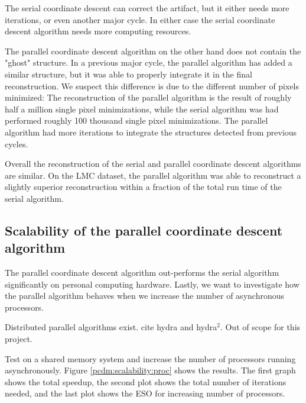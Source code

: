 The serial coordinate descent can correct the artifact, but it either needs more iterations, or even another major cycle. In either case the serial coordinate descent algorithm needs more computing resources.

The parallel coordinate descent algorithm on the other hand does not contain the "ghost" structure. In a previous major cycle, the parallel algorithm has added a similar structure, but it was able to properly integrate it in the final reconstruction. We suspect this difference is due to the different number of pixels minimized: The reconstruction of the parallel algorithm is the result of roughly half a million single pixel minimizations, while the serial algorithm was had performed roughly 100 thousand single pixel minimizations. The parallel algorithm had more iterations to integrate the structures detected from previous cycles.

Overall the reconstruction of the serial and parallel coordinate descent algorithms are similar. On the LMC dataset, the parallel algorithm was able to reconstruct a slightly superior reconstruction within a fraction of the total run time of the serial algorithm.


\subsection{Scalability of the parallel coordinate descent algorithm}
The parallel coordinate descent algorithm out-performs the serial algorithm significantly on personal computing hardware. Lastly, we want to investigate how the parallel algorithm behaves when we increase the number of asynchronous processors.

Distributed parallel algorithms exist. cite hydra\cite{richtarik2016distributed} and hydra$^2$\cite{fercoq2014fast}.
Out of scope for this project.

Test on a shared memory system and increase the number of processors running asynchronously. Figure \ref{pcdm:scalability:proc} shows the results. The first graph shows the total speedup, the second plot shows the total number of iterations needed, and the last plot shows the ESO for increasing number of processors.

